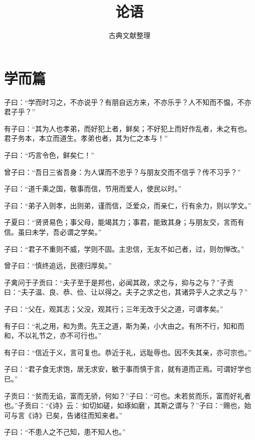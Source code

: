 \documentclass[12pt,a4paper]{ctexbook}
\title{论语}
\author{古典文献整理}
\date{}
\begin{document}
\maketitle
\tableofcontents
\newpage
\section{学而篇}
子曰：“学而时习之，不亦说乎？有朋自远方来，不亦乐乎？人不知而不愠，不亦君子乎？”\par
有子曰：“其为人也孝弟，而好犯上者，鲜矣；不好犯上而好作乱者，未之有也。君子务本，本立而道生。孝弟也者，其为仁之本与！”\par
子曰：“巧言令色，鲜矣仁！”\par
曾子曰：“吾日三省吾身：为人谋而不忠乎？与朋友交而不信乎？传不习乎？”\par
子曰：“道千乘之国，敬事而信，节用而爱人，使民以时。”\par
子曰：“弟子入则孝，出则弟，谨而信，泛爱众，而亲仁，行有余力，则以学文。”\par
子夏曰：“贤贤易色；事父母，能竭其力；事君，能致其身；与朋友交，言而有信。虽曰未学，吾必谓之学矣。”\par
子曰：“君子不重则不威，学则不固。主忠信，无友不如己者，过，则勿惮改。”\par
曾子曰：“慎终追远，民德归厚矣。”\par
子禽问于子贡曰：“夫子至于是邦也，必闻其政，求之与，抑与之与？”子贡曰：“夫子温、良、恭、俭、让以得之。夫子之求之也，其诸异乎人之求之与？”\par
子曰：“父在，观其志；父没，观其行；三年无改于父之道，可谓孝矣。”\par
有子曰：“礼之用，和为贵。先王之道，斯为美，小大由之。有所不行，知和而和，不以礼节之，亦不可行也。”\par
有子曰：“信近于义，言可复也。恭近于礼，远耻辱也。因不失其亲，亦可宗也。”\par
子曰：“君子食无求饱，居无求安，敏于事而慎于言，就有道而正焉。可谓好学也已。”\par
子贡曰：“贫而无谄，富而无骄，何如？”子曰：“可也。未若贫而乐，富而好礼者也。”子贡曰：“《诗》云：‘如切如磋，如琢如磨’，其斯之谓与？”子曰：“赐也，始可与言《诗》已矣，告诸往而知来者。”\par
子曰：“不患人之不己知，患不知人也。”\par
\end{document}
